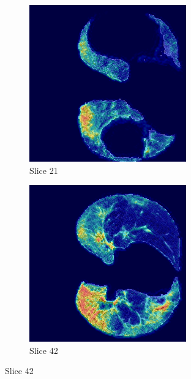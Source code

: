 \begin{figure}[!htbp]
\centering
\begin{subfigure}[b]{0.45\textwidth}
    \includegraphics[width=\textwidth]{img/label0_correcto_pred0_pid65HANX_slice_21.png}
    \caption{Slice 21}
\end{subfigure}
\hfill
\begin{subfigure}[b]{0.45\textwidth}
    \includegraphics[width=\textwidth]{img/label0_correcto_pred0_pid65HANX_slice_42.png}
    \caption{Slice 42}
\end{subfigure}


\end{figure}
